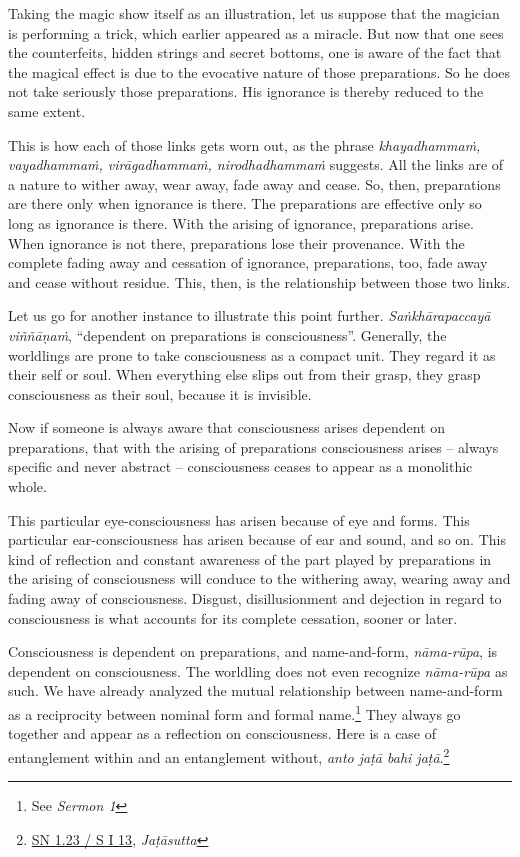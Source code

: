 Taking the magic show itself as an illustration, let us suppose that the magician is performing a trick, which earlier appeared as a miracle. But now that one sees the counterfeits, hidden strings and secret bottoms, one is aware of the fact that the magical effect is due to the evocative nature of those preparations. So he does not take seriously those preparations. His ignorance is thereby reduced to the same extent.

This is how each of those links gets worn out, as the phrase \emph{khayadhammaṁ, vayadhammaṁ, virāgadhammaṁ, nirodhadhammaṁ} suggests. All the links are of a nature to wither away, wear away, fade away and cease. So, then, preparations are there only when ignorance is there. The preparations are effective only so long as ignorance is there. With the arising of ignorance, preparations arise. When ignorance is not there, preparations lose their provenance. With the complete fading away and cessation of ignorance, preparations, too, fade away and cease without residue. This, then, is the relationship between those two links.

Let us go for another instance to illustrate this point further. \emph{Saṅkhārapaccayā viññāṇaṁ}, ``dependent on preparations is consciousness''. Generally, the worldlings are prone to take consciousness as a compact unit. They regard it as their self or soul. When everything else slips out from their grasp, they grasp consciousness as their soul, because it is invisible.

Now if someone is always aware that consciousness arises dependent on preparations, that with the arising of preparations consciousness arises -- always specific and never abstract -- consciousness ceases to appear as a monolithic whole.

This particular eye-consciousness has arisen because of eye and forms. This particular ear-consciousness has arisen because of ear and sound, and so on. This kind of reflection and constant awareness of the part played by preparations in the arising of consciousness will conduce to the withering away, wearing away and fading away of consciousness. Disgust, disillusionment and dejection in regard to consciousness is what accounts for its complete cessation, sooner or later.

Consciousness is dependent on preparations, and name-and-form, \emph{nāma-rūpa}, is dependent on consciousness. The worldling does not even recognize \emph{nāma-rūpa} as such. We have already analyzed the mutual relationship between name-and-form as a reciprocity between nominal form and formal name.\footnote{See \emph{Sermon 1}} They always go together and appear as a reflection on consciousness. Here is a case of entanglement within and an entanglement without, \emph{anto jaṭā bahi jaṭā}.\footnote{\href{https://suttacentral.net/sn1.23/pli/ms}{SN 1.23 / S I 13}, \emph{Jaṭāsutta}}

